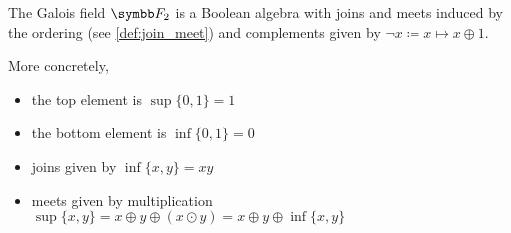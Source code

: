 \begin{theorem}\label{thm:f2_is_boolean_algebra}
  The Galois field \( \BF_2 \) is a Boolean algebra with joins and meets induced by the ordering (see \cref{def:join_meet}) and complements given by \( \neg x \coloneqq x \mapsto x \oplus 1 \).

  More concretely,
  \begin{itemize}
    \item the top element is \( \sup \{ 0, 1 \} = 1 \)
    \item the bottom element is \( \inf \{ 0, 1 \} = 0 \)
    \item joins given by \( \inf \{ x, y \} = xy \)
    \item meets given by multiplication \( \sup \{ x, y \} = x \oplus y \oplus (x \odot y) = x \oplus y \oplus \inf \{ x, y \} \)
  \end{itemize}
\end{theorem}

